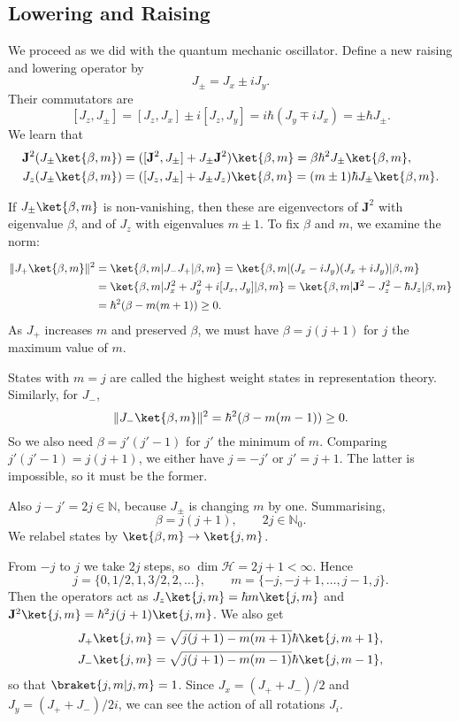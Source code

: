 \documentclass[12pt]{article}
\begin{document}
\subsection{Lowering and Raising}
\label{sub:low_raise}

We proceed as we did with the quantum mechanic oscillator. Define a new raising and lowering operator by
\[
J_{\pm} = J_x \pm i J_y.
\]
Their commutators are
\[
	[J_z, J_{\pm}] = [J_z, J_x] \pm i [J_z, J_y] = i\hbar(J_y \mp iJ_x) = \pm \hbar J_{\pm}.
\]
We learn that
\begin{align*}
	\mathbf{J}^2 (J_{\pm}\ket{\beta, m}) &= ([\mathbf{J}^2, J_{\pm}] + J_{\pm} \mathbf{J}^2) \ket{\beta, m} = \beta \hbar^2 J_{\pm} \ket{\beta, m}, \\
	J_z(J_{\pm}\ket{\beta, m}) &= ([J_z,J_{\pm}] + J_{\pm} J_z)\ket{\beta,m} = (m \pm 1)\hbar J_{\pm} \ket{\beta, m}.
\end{align*}

If $J_{\pm}\ket{\beta, m}$ is non-vanishing, then these are eigenvectors of $\mathbf{J}^2$ with eigenvalue $\beta$, and of $J_z$ with eigenvalues $m \pm 1$. To fix $\beta$ and $m$, we examine the norm:

\begin{align*}
	\|J_{+}\ket{\beta,m}\|^2 &= \ket{\beta,m|J_-J_+|\beta,m} = \ket{\beta,m|(J_x-iJ_y)(J_x+iJ_y)|\beta,m}\\
				 &=\ket{\beta,m|J_x^2+J_y^2 + i[J_x,J_y]|\beta,m} = \ket{\beta,m|\mathbf{J}^2-J_z^2-\hbar J_z|\beta,m}\\
				 &=\hbar^2(\beta-m(m+1))\geq 0.
\end{align*}
As $J_+$ increases $m$ and preserved $\beta$, we must have $\beta = j(j+1)$ for $j$ the maximum value of $m$.

States with $m = j$ are called the highest weight states in representation theory. Similarly, for $J_-$,
\[
	\|J_-\ket{\beta,m}\|^2 = \hbar^2(\beta - m(m-1)) \geq 0.
\]
So we also need $\beta = j'(j' - 1)$ for $j'$ the minimum of $m$. Comparing $j'(j'-1) = j(j+1)$, we either have $j = -j'$ or $j' = j+1$. The latter is impossible, so it must be the former.

Also $j - j' = 2j \in \mathbb{N}$, because $J_{\pm}$ is changing $m$ by one. Summarising,
\[
\beta = j(j+1), \qquad 2j \in \mathbb{N}_0.
\]
We relabel states by $\ket{\beta,m} \to \ket{j,m}$.

From $-j$ to $j$ we take $2j$ steps, so $\dim \mathcal{H} = 2j+1 < \infty$. Hence
\[
	j = \{0, 1/2, 1, 3/2, 2, \ldots\}, \qquad m = \{-j, -j+1, \ldots, j-1, j\}.
\]
Then the operators act as $J_z\ket{j,m} = \hbar m\ket{j,m}$ and $\mathbf{J}^2\ket{j,m} = \hbar^2 j(j+1)\ket{j,m}$. We also get
\begin{align*}
	J_{+}\ket{j,m} &= \sqrt{j(j+1)-m(m+1)} \hbar \ket{j,m+1}, \\
	J_-\ket{j,m} &= \sqrt{j(j+1)-m(m-1)}\hbar \ket{j,m-1},
\end{align*}
so that $\braket{j,m|j,m}=1$. Since $J_x = (J_+ + J_-)/2$ and $J_y = (J_+ + J_-)/2i$, we can see the action of all rotations $J_i$.
\end{document}
